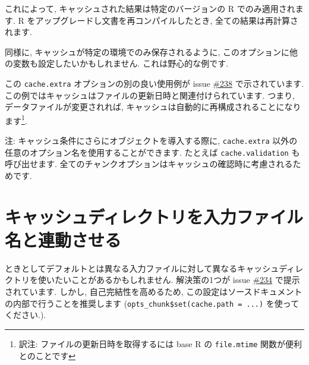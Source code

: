 \documentclass[
]{bxjsreport}
\newenvironment{Shaded}{\begin{snugshade}}{\end{snugshade}}
\newcommand{\AttributeTok}[1]{\textcolor[rgb]{0.77,0.63,0.00}{#1}}
\newcommand{\DocumentationTok}[1]{\textcolor[rgb]{0.56,0.35,0.01}{\textbf{\textit{#1}}}}
\newcommand{\FunctionTok}[1]{\textcolor[rgb]{0.00,0.00,0.00}{#1}}
\newcommand{\NormalTok}[1]{#1}
\newcommand{\SpecialCharTok}[1]{\textcolor[rgb]{0.00,0.00,0.00}{#1}}
\newcommand{\StringTok}[1]{\textcolor[rgb]{0.31,0.60,0.02}{#1}}
\begin{document}
これによって, キャッシュされた結果は特定のバージョンの R
でのみ適用されます. R をアップグレードし文書を再コンパイルしたとき,
全ての結果は再計算されます.

同様に, キャッシュが特定の環境でのみ保存されるように,
このオプションに他の変数も設定したいかもしれません.
これは野心的な例です.

\begin{Shaded}
\end{Shaded}

この \texttt{cache.extra} オプションの別の良い使用例が issue
\href{https://github.com/yihui/knitr/issues/238}{\#238}
で示されています.
この例ではキャッシュはファイルの更新日時と関連付けられています. つまり,
データファイルが変更されれば,
キャッシュは自動的に再構成されることになります\footnote{訳注:
  ファイルの更新日時を取得するには base R の \texttt{file.mtime}
  関数が便利とのことです}.

注: キャッシュ条件にさらにオブジェクトを導入する際に,
\texttt{cache.extra} 以外の任意のオプション名を使用することができます.
たとえば \texttt{cache.validation} も呼び出せます.
全てのチャンクオプションはキャッシュの確認時に考慮されるためです.

\hypertarget{ux30adux30e3ux30c3ux30b7ux30e5ux30c7ux30a3ux30ecux30afux30c8ux30eaux3092ux5165ux529bux30d5ux30a1ux30a4ux30ebux540dux3068ux9023ux52d5ux3055ux305bux308b}{%
\section*{キャッシュディレクトリを入力ファイル名と連動させる}\label{ux30adux30e3ux30c3ux30b7ux30e5ux30c7ux30a3ux30ecux30afux30c8ux30eaux3092ux5165ux529bux30d5ux30a1ux30a4ux30ebux540dux3068ux9023ux52d5ux3055ux305bux308b}}

ときとしてデフォルトとは異なる入力ファイルに対して異なるキャッシュディレクトリを使いたいことがあるかもしれません.
解決策の1つが issue
\href{https://github.com/yihui/knitr/issues/234}{\#234}
で提示されています. しかし, 自己完結性を高めるため,
この設定はソースドキュメントの内部で行うことを推奨します
(\texttt{opts\_chunk\$set(cache.path\ =\ ...)} を使ってください.).
\end{document}
